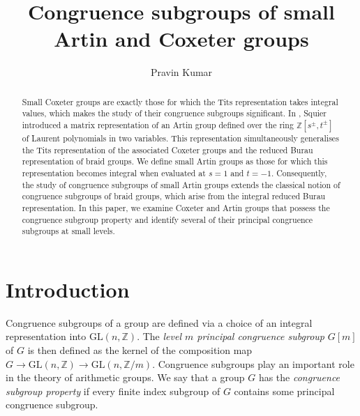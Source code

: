 \documentclass[12pt]{amsart}
\theoremstyle{definition}
\numberwithin{equation}{section}
\begin{document}
\title[Congruence subgroups]{Congruence subgroups of small Artin and Coxeter groups}

\author{Pravin Kumar}
\address{Beijing Institute of Mathematical Sciences and Applications, Beijing 101408, China.}


\begin{abstract}

Small Coxeter groups are exactly those for which the Tits representation takes integral values, which makes the study of their congruence subgroups significant. In \cite{MR0938643}, Squier introduced a matrix representation of an Artin group defined over the ring $\mathbb Z[s^{\pm}, t^{\pm}]$ of Laurent polynomials in two variables. This representation simultaneously generalises the Tits representation of the associated Coxeter groups and the reduced Burau representation of braid groups. We define small Artin groups as those for which this representation becomes integral when evaluated at $s=1$ and $t=-1$. Consequently, the study of congruence subgroups of small Artin groups extends the classical notion of congruence subgroups of braid groups, which arise from the integral reduced Burau representation. In this paper, we examine Coxeter and Artin groups that possess the congruence subgroup property and identify several of their principal congruence subgroups at small levels.

\end{abstract}

\maketitle
\section{Introduction}
Congruence subgroups of a group are defined via a choice of an integral representation into $\mathrm{GL}(n, \mathbb{Z})$. The {\it level $m$ principal congruence subgroup} $G[m]$ of $G$ is then defined as the kernel of the composition map $G \rightarrow \mathrm{GL}(n, \mathbb{Z}) \rightarrow \mathrm{GL}(n, \mathbb{Z} / m)$. Congruence subgroups play an important role in the theory of arithmetic groups. We say that a group $G$ has the {\it congruence subgroup property} if every finite index subgroup of $G$ contains some principal congruence subgroup.
\par
\end{document}
